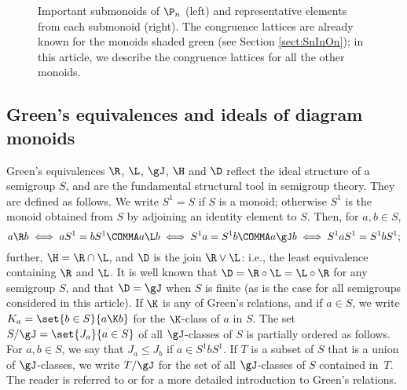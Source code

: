 \begin{figure}[ht]
\begin{center}
\end{center}
\vspace{-5mm}
\caption{Important submonoids of $\P_n$ (left) and representative elements from each submonoid (right). The congruence lattices are already known for the monoids shaded green (see Section \ref{sect:SnInOn}); in this article, we describe the congruence lattices for all the other monoids.}
\label{fig:submonoids}
\end{figure}






\subsection{Green's equivalences and ideals of diagram monoids}
\label{sec:prelim_Green}

Green's equivalences $\R$, $\L$, $\gJ$, $\H$ and $\D$ reflect the ideal
structure of a semigroup $S$, and are the fundamental structural tool in
semigroup theory.  They are defined as follows.  We write $S^1=S$ if $S$ is a monoid; otherwise $S^1$ is the monoid
obtained from $S$ by adjoining an identity element to $S$.  Then, for $a,b\in S$,
\[
a\R b \iff aS^1=bS^1 \COMMA a\L b \iff S^1a=S^1b \COMMA a\gJ b \iff S^1aS^1 = S^1bS^1;
\]
further, ${\H}={\R}\cap{\L}$, and $\D$ is the join ${\R}\vee{\L}$: i.e., the least equivalence containing $\R$ and $\L$.
It is well known that ${\D}={\R}\circ{\L}={\L}\circ{\R}$ for any semigroup $S$, and that ${\D}={\gJ}$ when $S$ is finite (as is the case for all semigroups considered in this article).  
%
If $\K$ is any of Green's relations, and if $a\in S$, we write $K_a=\set{b\in S}{a\K b}$ for the $\K$-class of $a$ in $S$.
%
The set $S/{\gJ}=\set{J_a}{a\in S}$ of all $\gJ$-classes of $S$ is partially ordered as follows.  
For $a,b\in S$, we say that $J_a\leq J_b$ if $a\in S^1bS^1$.  If $T$ is a subset of $S$ that is a union of $\gJ$-classes, we write $T/{\gJ}$ for the set of all $\gJ$-classes of $S$ contained in~$T$.
%
The reader is referred to \cite[Chapter 2]{Howie} or \cite[Appendix A]{RSbook} for a more detailed introduction to Green's relations.  


